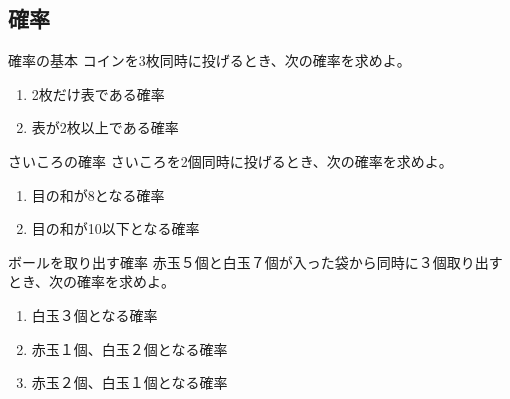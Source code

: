 \documentclass[10pt,dvipdfmx]{jsarticle}
\begin{document}
\subsection*{確率}
\begin{itembox}[l]{確率の基本}
  コインを3枚同時に投げるとき、次の確率を求めよ。
  \begin{enumerate}
    \item 2枚だけ表である確率
    \item 表が2枚以上である確率
  \end{enumerate}
\end{itembox}
\begin{itembox}[l]{さいころの確率}
  さいころを2個同時に投げるとき、次の確率を求めよ。
  \begin{enumerate}
    \item 目の和が8となる確率
    \item 目の和が10以下となる確率
  \end{enumerate}
\end{itembox}
\begin{itembox}[l]{ボールを取り出す確率}
  赤玉５個と白玉７個が入った袋から同時に３個取り出すとき、次の確率を求めよ。
  \begin{enumerate}
    \item 白玉３個となる確率
    \item 赤玉１個、白玉２個となる確率
    \item 赤玉２個、白玉１個となる確率
  \end{enumerate}
\end{itembox}
\end{document}

